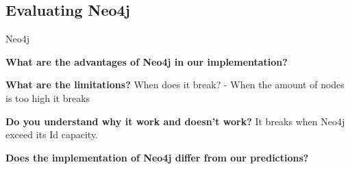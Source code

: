 \subsection{Evaluating Neo4j}

Neo4j 


\textbf{What are the advantages of Neo4j in our implementation?}

\textbf{What are the limitations?}
When does it break? - When the amount of nodes is too high it breaks

\textbf{Do you understand why it work and doesn't work?}
It breaks when Neo4j exceed its Id capacity.

\textbf{Does the implementation of Neo4j differ from our predictions?}

